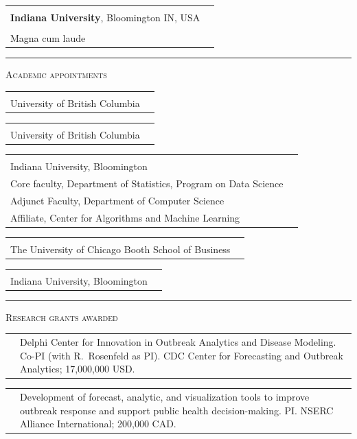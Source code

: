 \documentclass[11pt,letterpaper]{minimal/moderncv}
\makeatletter
\newcommand{\xx}{\textcolor{white}{2022}}
\newcommand{\jog}{\hspace*{2ex}}
\renewcommand{\cventry}[2]{\cvitem{#1}{\begin{minipage}[t]{\maincolumnwidth}#2\end{minipage}}}
\renewcommand{\section}[1]{  \par\addvspace{15pt}%
  \parbox[t]{\hintscolumnwidth}{\strut\raggedleft\raisebox{4pt}%
  {\rule{\hintscolumnwidth}{2pt}}}%
  \hspace{\separatorcolumnwidth}%
  \textsc{\Large #1}\par\nobreak\addvspace{6pt}%
}
\renewcommand*{\cvitem}[2]{%
  \begin{tabular}{@{}p{\hintscolumnwidth}@{\hspace{\separatorcolumnwidth}}%
    p{\maincolumnwidth}@{}}%
    \raggedleft {#1} &  {#2}%
  \end{tabular}%
}
\makeatother
\begin{document}
\vspace{3pt}
\cventry{2006}{Bachelor of Science in Music and an Outside Field\\
\textbf{Indiana 
University}, Bloomington IN, USA \\{\small Majors: Cello Performance and
Mathematics\\ \jog Magna cum laude}}


\section{Academic appointments}

\cventry{2025--\xx}{\textbf{Professor of Statistics}\\University of
British Columbia}

\vspace{3pt}
\cventry{2020--2025}{\textbf{Associate Professor of Statistics}\\University of British Columbia}

\vspace{3pt}
\cventry{2018--2020}{\textbf{Associate Professor of Statistics}\\Indiana
University, Bloomington \\ Core faculty, 
Department of Statistics, Program on Data Science \\ Adjunct
Faculty, Department of Computer Science \\ Affiliate, Center for
Algorithms and Machine Learning}

\vspace{3pt} 
\cventry{2018--2019}{\textbf{Visiting Associate Professor of Econometrics and
Statistics}\\The University of Chicago Booth School of Business} 

\vspace{3pt}
\cventry{2012--2018}{\textbf{Assistant Professor of Statistics}\\Indiana
University, Bloomington} 

\section{Research grants awarded}

\cvitem{2023--2028}{Delphi Center for Innovation in Outbreak Analytics and
Disease Modeling. Co-PI (with R.\ Rosenfeld as PI). CDC Center for Forecasting
and Outbreak Analytics; 17,000,000 USD. }

\cvitem{2023--2026}{Development of forecast, analytic, and visualization tools
to improve outbreak response and support public health decision-making. PI.
NSERC Alliance International; 200,000 CAD.}
\end{document}
